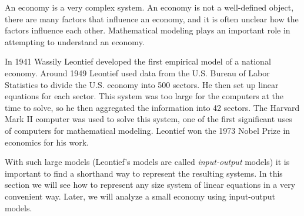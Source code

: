  \label{sec:matrix_vector}

\vspace*{-17 pt}

\vspace*{13 pt}


An economy is a very complex system. An economy is not a well-defined object, there are many factors that influence an economy, and it is often unclear how the factors influence each other. Mathematical modeling plays an important role in attempting to understand an economy.

In 1941 Wassily Leontief developed the first empirical model of a national economy. Around 1949 Leontief used data from the U.S. Bureau of Labor Statistics to divide the U.S. economy into 500 sectors. He then set up linear equations for each sector. This system was too large for the computers at the time to solve, so he then aggregated the information into 42 sectors. The Harvard Mark II computer was used to solve this system, one of the first significant uses of computers for mathematical modeling. Leontief won the 1973 Nobel Prize in economics for his work. 

With such large models (Leontief's models are called \emph{input-output} models) it is important to find a shorthand way to represent the resulting systems.  In this section we will see how to represent any size system of linear equations in a very convenient way. Later, we will analyze a small economy using input-output models. 

